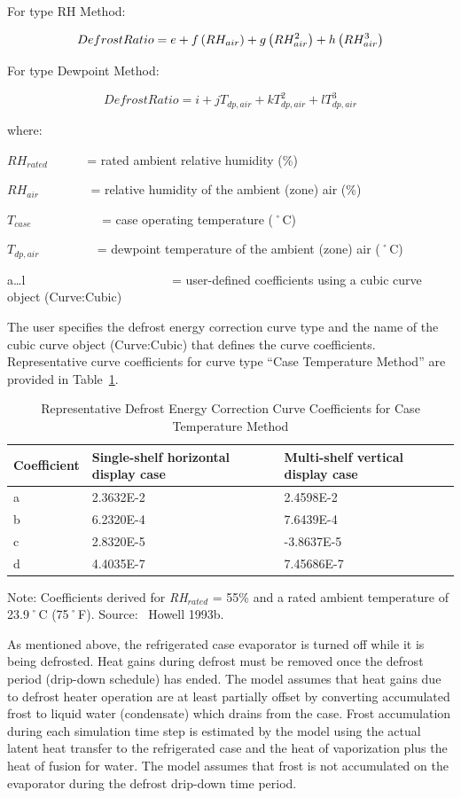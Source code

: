 For type RH Method:

\begin{equation}
  DefrostRatio = e + f \left(RH_{air}\right) + g \left(RH_{air}^2\right) + h \left(RH_{air}^3\right)
\end{equation}

For type Dewpoint Method:

\begin{equation}
  DefrostRatio = i + j T_{dp,air} + k T_{dp,air}^2 + l T_{dp,air}^3
\end{equation}

where:

\(R{H_{rated}}\) ~~~~~ = rated ambient relative humidity (\%)

\(R{H_{air}}\) ~~~~~~~ = relative humidity of the ambient (zone) air (\%)

\({T_{case}}\) ~~~~~~~~~~ = case operating temperature (˚C)

\({T_{dp,air}}\) ~~~~~~~~ = dewpoint temperature of the ambient (zone) air (˚C)

a\ldots{}l~~~~~~~~~~~~~~~~~~~~~~~ = user-defined coefficients using a cubic curve object (Curve:Cubic)

The user specifies the defrost energy correction curve type and the name of the cubic curve object (Curve:Cubic) that defines the curve coefficients. Representative curve coefficients for curve type ``Case Temperature Method'' are provided in Table~\ref{table:representative-defrost-energy-correction}.

\begin{longtable}[c]{p{1.5in}p{2.36in}p{2.13in}}
\caption{Representative Defrost Energy Correction Curve Coefficients for Case Temperature Method \label{table:representative-defrost-energy-correction}} \tabularnewline
\toprule 
Coefficient & Single-shelf horizontal display case & Multi-shelf vertical display case \tabularnewline \midrule
\endhead

a & 2.3632E-2 & 2.4598E-2 \tabularnewline
b & 6.2320E-4 & 7.6439E-4 \tabularnewline
c & 2.8320E-5 & -3.8637E-5 \tabularnewline
d & 4.4035E-7 & 7.45686E-7 \tabularnewline
\bottomrule
\end{longtable}

Note: Coefficients derived for \emph{RH\(_{rated}\)} = 55\% and a rated ambient temperature of 23.9˚C (75˚F). Source:~ Howell 1993b.

As mentioned above, the refrigerated case evaporator is turned off while it is being defrosted. Heat gains during defrost must be removed once the defrost period (drip-down schedule) has ended. The model assumes that heat gains due to defrost heater operation are at least partially offset by converting accumulated frost to liquid water (condensate) which drains from the case. Frost accumulation during each simulation time step is estimated by the model using the actual latent heat transfer to the refrigerated case and the heat of vaporization plus the heat of fusion for water. The model assumes that frost is not accumulated on the evaporator during the defrost drip-down time period.

